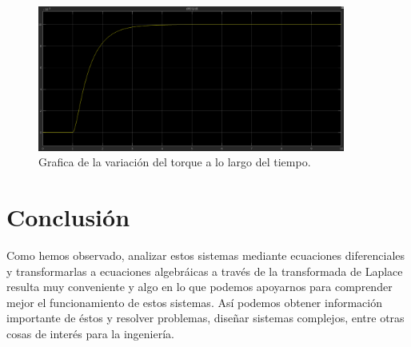 \documentclass[12pt, letterpaper]{article}
\begin{document}
\begin{enumerate}
		\begin{figure}[H]
			\centering
			\includegraphics[width=0.9\textwidth]{19.png}
			\caption{Grafica de la variación del torque a lo largo del tiempo.}
		\end{figure}
\end{enumerate}
\section*{Conclusión}
Como hemos observado, analizar estos sistemas mediante ecuaciones diferenciales y transformarlas a ecuaciones algebráicas a través de la transformada de Laplace resulta muy conveniente y algo en lo que podemos apoyarnos para comprender mejor el funcionamiento de estos sistemas. Así podemos obtener información importante de éstos y resolver problemas, diseñar sistemas complejos, entre otras cosas de interés para la ingeniería.
\renewcommand\refname{Referencias}
\printbibliography
\end{document}
